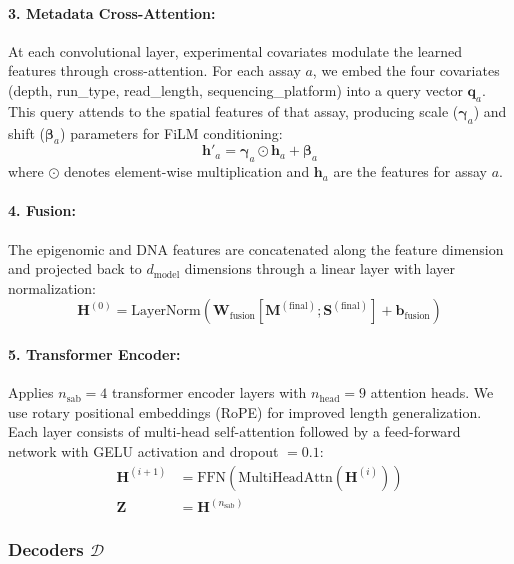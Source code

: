 \paragraph{3. Metadata Cross-Attention:} 
At each convolutional layer, experimental covariates modulate the learned features through cross-attention. For each assay $a$, we embed the four covariates (depth, run\_type, read\_length, sequencing\_platform) into a query vector $\mathbf{q}_a$. This query attends to the spatial features of that assay, producing scale ($\boldsymbol{\gamma}_a$) and shift ($\boldsymbol{\beta}_a$) parameters for FiLM conditioning:
\begin{equation}
    \mathbf{h}'_a = \boldsymbol{\gamma}_a \odot \mathbf{h}_a + \boldsymbol{\beta}_a
\end{equation}
where $\odot$ denotes element-wise multiplication and $\mathbf{h}_a$ are the features for assay $a$.

\paragraph{4. Fusion:} 
The epigenomic and DNA features are concatenated along the feature dimension and projected back to $d_{\text{model}}$ dimensions through a linear layer with layer normalization:
\begin{equation}
    \mathbf{H}^{(0)} = \text{LayerNorm}\left(\mathbf{W}_{\text{fusion}} \left[\mathbf{M}^{(\text{final})}; \mathbf{S}^{(\text{final})}\right] + \mathbf{b}_{\text{fusion}}\right)
\end{equation}

\paragraph{5. Transformer Encoder:} 
Applies $n_{\text{sab}} = 4$ transformer encoder layers with $n_{\text{head}} = 9$ attention heads. We use rotary positional embeddings (RoPE) for improved length generalization. Each layer consists of multi-head self-attention followed by a feed-forward network with GELU activation and dropout $= 0.1$:
\begin{align}
    \mathbf{H}^{(i+1)} &= \text{FFN}\left(\text{MultiHeadAttn}\left(\mathbf{H}^{(i)}\right)\right) \\
    \mathbf{Z} &= \mathbf{H}^{(n_{\text{sab}})}
\end{align}

\subsubsection{Decoders $\mathcal{D}$}

